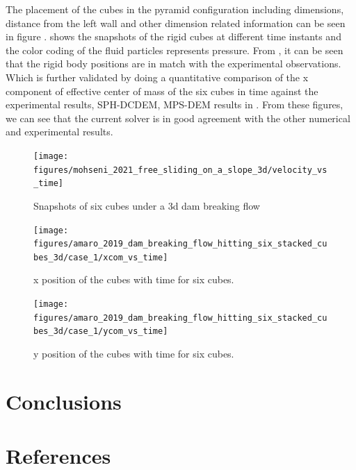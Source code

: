 \documentclass[preprint,12pt]{elsarticle}
\begin{document}
The placement of the cubes in the pyramid configuration including dimensions,
distance from the left wall and other dimension related information can be
seen in figure .
 shows the snapshots of
the rigid cubes at different time instants and the color coding of the fluid
particles represents pressure. From
, it can be seen that the
rigid body positions are in match with the experimental observations. Which is
further validated by doing a quantitative comparison of the x component of
effective center of mass of the six cubes in time against the experimental
results, SPH-DCDEM, MPS-DEM results in
. From these figures, we
can see that the current solver is in good agreement with the other numerical
and experimental results.
\begin{figure}[!htpb]
  \centering
  \texttt{[image: figures/mohseni\_2021\_free\_sliding\_on\_a\_slope\_3d/velocity\_vs\_time]}
  \caption{Snapshots of six cubes under a 3d dam breaking flow}
\label{fig:snapshots-six-cubes-3d-dam-breaking-flow}
\end{figure}
\begin{figure}[!htpb]
  \centering
  \texttt{[image: figures/amaro\_2019\_dam\_breaking\_flow\_hitting\_six\_stacked\_cubes\_3d/case\_1/xcom\_vs\_time]}
  \caption{x position of the cubes with time for six cubes.}
\label{fig:x-position-six-cubes-3d-dam-breaking-flow}
\end{figure}
\begin{figure}[!htpb]
  \centering
  \texttt{[image: figures/amaro\_2019\_dam\_breaking\_flow\_hitting\_six\_stacked\_cubes\_3d/case\_1/ycom\_vs\_time]}
  \caption{y position of the cubes with time for six cubes.}
\label{fig:y-position-six-cubes-3d-dam-breaking-flow}
\end{figure}








\section{Conclusions}
\label{sec:conclusions}

\section*{References}


\end{document}
